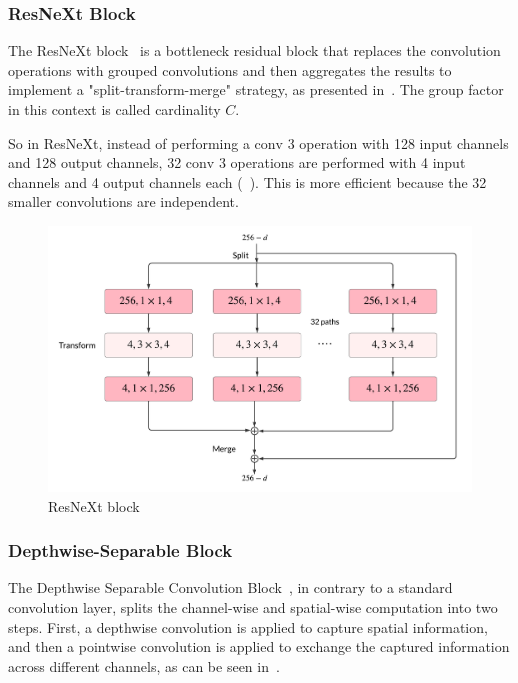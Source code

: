     
        \subsubsection{ResNeXt Block}
        
            The ResNeXt block~\cite{resnext} is a bottleneck residual block that replaces the convolution operations with grouped convolutions and then aggregates the results to implement a "split-transform-merge" strategy, as presented in~. The group factor in this context is called cardinality $C$.
            
            So in ResNeXt, instead of performing a $\text{conv}$ 3 operation with 128 input channels and 128 output channels, 32 $\text{conv}$ 3 operations are performed with 4 input channels and 4 output channels each (~). This is more efficient because the 32 smaller convolutions are independent.

            \begin{figure}[hbt!]
                \begin{center}
                \includegraphics[width=.9\textwidth]{assets/images/resnext.png}
                \end{center}
                \caption{ResNeXt block}%
                \label{fig:hw-nas:dl:resnext}
            \end{figure}
            
            
        
        \subsubsection{Depthwise-Separable Block}
        
            The Depthwise Separable Convolution Block~\cite{mobilenet}, in contrary to a standard convolution layer, splits the channel-wise and spatial-wise computation into two steps. First, a depthwise convolution is applied to capture spatial information, and then a pointwise convolution is applied to exchange the captured information across different channels, as can be seen in~.

